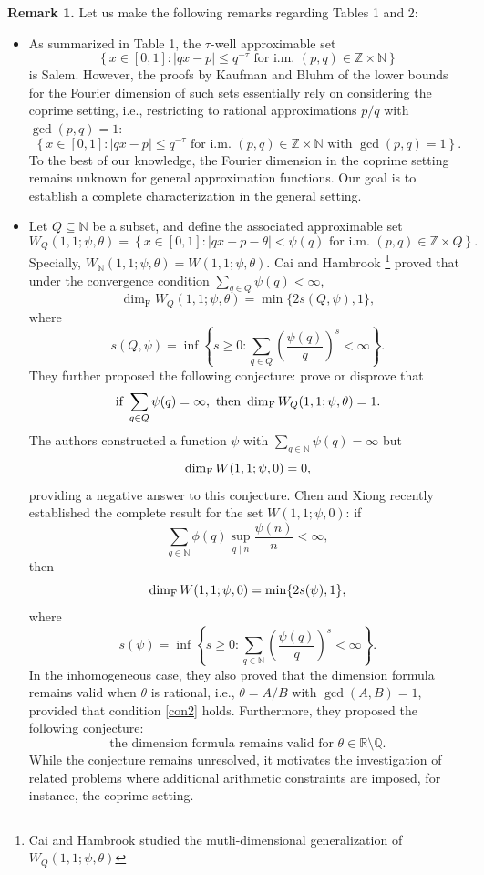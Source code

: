 \documentclass[12pt,a4paper,twoside]{article}
\begin{document}
\noindent\textbf{Remark 1.} Let us make the following remarks regarding Tables 1 and 2:
\begin{itemize}
\item As summarized in Table 1, the \(\tau\)-well approximable set
\[
\left\{ x \in [0,1] : |qx - p| \le q^{-\tau} \text{ for i.m. } (p,q) \in \mathbb{Z} \times \mathbb{N} \right\}
\]
is Salem. However, the proofs by Kaufman and Bluhm of the lower bounds for the Fourier dimension of such sets essentially rely on considering the coprime setting, i.e., restricting to rational approximations \(p/q\) with \(\gcd(p,q) = 1\):
\[
\left\{ x \in [0,1] : |qx - p| \le q^{-\tau} \text{ for i.m. } (p,q) \in \mathbb{Z} \times \mathbb{N} \text{ with } \gcd(p,q) = 1 \right\}.
\]
To the best of our knowledge, the Fourier dimension in the coprime setting remains unknown for general approximation functions. Our goal is to establish a complete characterization in the general setting.



\item  Let $Q \subseteq \mathbb{N}$ be  a subset, and define the associated approximable set
\[
W_Q(1,1;\psi,\theta) = \left\{ x \in [0,1] : |qx - p - \theta| < \psi(q) \text{ for i.m. } (p,q) \in \mathbb{Z} \times Q \right\}.
\]
Specially, $W_{\mathbb{N}}(1,1;\psi,\theta)=W(1,1;\psi,\theta).$ Cai and Hambrook \cite[Theorem 1.4.1]{CH24}{\footnote{Cai and Hambrook studied the mutli-dimensional generalization of $W_Q(1,1;\psi,\theta)$}} proved that under the convergence condition $\sum_{q \in Q} \psi(q) < \infty$,
\[
\dim_{\mathrm{F}} W_Q(1,1;\psi,\theta) = \min\{ 2 s(Q,\psi), 1 \},
\]
where
\[
s(Q,\psi) = \inf \left\{ s \ge 0 : \sum_{q \in Q} \left( \frac{\psi(q)}{q} \right)^s < \infty \right\}.
\]
They further proposed the following conjecture: prove or disprove that
\[
\text{if } \sum_{q\in Q}\psi(q)=\infty,\text{ then } \dim_{{\rm F}}W_Q(1,1;\psi,\theta)=1.
\]
The authors \cite{TZ25} constructed a function \( \psi \) with
\(
\sum_{q \in \mathbb{N}} \psi(q) = \infty
\)
but
\[
\dim_{\rm F} W(1, 1; \psi, 0) = 0,
\]
providing a negative answer to this conjecture. Chen and Xiong recently established the complete result for the set $W(1,1;\psi,0)$: if
\begin{equation}\label{con2}
\sum_{q\in \mathbb{N}}\phi(q)\sup_{q\mid n}\frac{\psi(n)}{n}<\infty,
\end{equation}
then
\[
\dim_{\rm F}W(1,1;\psi,0)=\min\{2s(\psi),1\},
\]
where
\[
s(\psi)=\inf\left\{s\ge 0\colon \sum_{q\in \mathbb{N}}\left(\frac{\psi(q)}{q}\right)^{s}<\infty\right\}.
\]
In the inhomogeneous case, they also proved that the dimension formula remains valid when $\theta$ is rational, i.e., $\theta = A/B$ with $\gcd(A,B)=1$, provided that condition \eqref{con2} holds.
Furthermore, they proposed the following conjecture:
\[\text{the dimension formula remains valid for } \theta\in \mathbb{R}\setminus\mathbb{Q}. \]
While the conjecture remains unresolved, it motivates the investigation of related problems where additional arithmetic constraints are imposed, for instance, the coprime setting.


\end{itemize}
\end{document}
